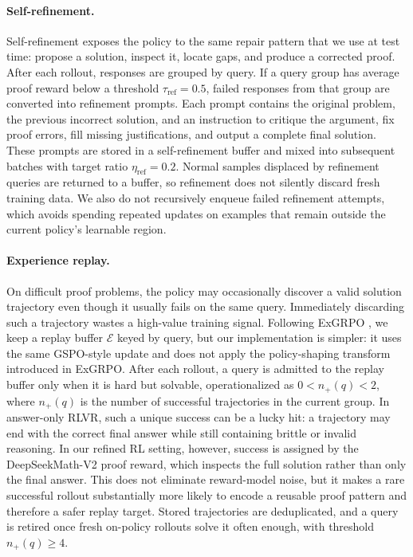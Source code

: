 \paragraph{Self-refinement.}
Self-refinement exposes the policy to the same repair pattern that we use at
test time: propose a solution, inspect it, locate gaps, and produce a corrected
proof. After each rollout, responses are grouped by query. If a query group has
average proof reward below a threshold $\tau_{\mathrm{ref}}=0.5$, failed
responses from that group are converted into refinement prompts. Each prompt
contains the original problem, the previous incorrect solution, and an
instruction to critique the argument, fix proof 
errors, fill
missing justifications, and output a complete final solution. These prompts are
stored in a self-refinement buffer and mixed into subsequent batches with target
ratio $\eta_{\mathrm{ref}}=0.2$. Normal samples displaced by refinement queries
are returned to a buffer, so refinement does not silently discard fresh
training data. We also do not recursively enqueue failed refinement attempts,
which avoids spending repeated updates on examples that remain outside the
current policy's learnable region.

\paragraph{Experience replay.}
On difficult proof problems,
the policy may occasionally discover a valid solution trajectory even though it
usually fails on the same query. Immediately discarding such a trajectory wastes
a high-value training signal. Following ExGRPO
\citep{exgrpo}, we keep a replay buffer $\mathcal{E}$ keyed by query, but our
implementation is simpler: it uses the same GSPO-style update and does not apply
the policy-shaping transform introduced in ExGRPO. After each rollout, a query
is admitted to the replay buffer only when it is hard but solvable, operationalized as
$0<n_+(q)<2$, where $n_+(q)$ is the number of successful trajectories in the
current group. In answer-only RLVR, such a unique success can be a lucky hit: a
trajectory may end with the correct final answer while still containing brittle
or invalid reasoning\citep{exgrpo}. 
In our refined RL setting, however, success is assigned by the
DeepSeekMath-V2 proof reward, which inspects the full solution rather than only
the final answer. This does not eliminate reward-model noise, but it makes a
rare successful rollout substantially more likely to encode a reusable proof
pattern and therefore a safer replay target. Stored trajectories are
deduplicated, and a query is retired once fresh on-policy rollouts solve it
often enough, with threshold $n_+(q)\ge 4$.

